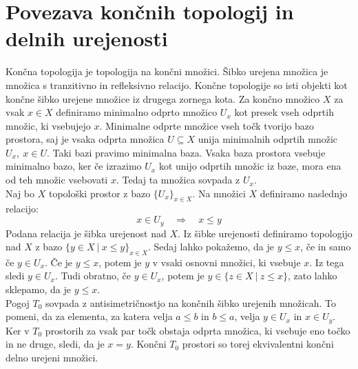 \documentclass[a4paper, 12pt]{book}
\theoremstyle{definition}
\theoremstyle{remark}
\begin{document}
\section{Povezava končnih topologij in delnih urejenosti}\label{poset-top}
Končna topologija je topologija na končni množici. Šibko urejena množica je
množica s tranzitivno in refleksivno relacijo. Končne topologije so isti objekti
kot končne šibko urejene množice iz drugega zornega kota. Za končno množico $X$ 
za vsak $x\in X$ definiramo minimalno odprto množico $U_x$ kot presek vseh odprtih
množic, ki vsebujejo $x$. Minimalne odprte množice vseh točk tvorijo bazo prostora,
saj je vsaka odprta množica $U \subseteq X$ unija minimalnih odprtih množic $U_x,\ x\in U$.
Taki bazi pravimo minimalna baza. Vsaka baza prostora vsebuje minimalno bazo,
ker če izrazimo $U_x$ kot unijo odprtih množic iz baze, mora ena od teh množic
vsebovati $x$. Tedaj ta množica sovpada z $U_x$.\\
Naj bo $X$ topološki prostor z bazo $\{U_x\}_{x \in X}$. Na množici $X$ definiramo
naslednjo relacijo:
\[x \in U_y\quad \Rightarrow\quad x \leq y\]
Podana relacija je šibka urejenost nad $X$. Iz šibke urejenosti
definiramo topologijo nad $X$ z bazo $\{y \in X\ |\ x \leq y\}_{x \in X}$.
Sedaj lahko pokažemo, da je $y \leq x$, če in samo če $y \in U_x$.
Če je $y \leq x$, potem je $y$ v vsaki osnovni množici, ki vsebuje $x$. Iz tega sledi $y \in U_x$.
Tudi obratno, če $y \in U_x$, potem je $y \in \{z \in X\ |\ z \leq x\}$, zato lahko sklepamo, da je $y \leq x$.\\
Pogoj $T_0$ sovpada z antisimetričnostjo na končnih šibko urejenih množicah.
To pomeni, da za elementa, za katera velja $a \leq b$ in $b \leq a$, velja $y \in U_x$ in $x \in U_y$.
Ker v $T_0$ prostorih za vsak par točk obstaja odprta množica,
ki vsebuje eno točko in ne druge, sledi, da je $x = y$. Končni $T_0$ prostori so
torej ekvivalentni končni delno urejeni množici.\\
\end{document}
